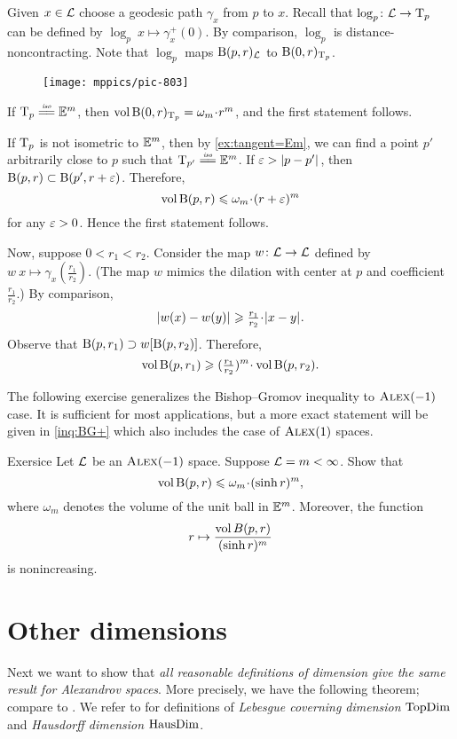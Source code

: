 Given $x\in\mathcal{L}$ choose a geodesic path $\gamma_x$ from $p$ to $x$.
Recall that $\log_p\colon\mathcal{L}\to \mathrm{T}_p$ can be defined by $\log_p\:x\mapsto \gamma_x^+(0)$.
By comparison, $\log_p$ is distance-noncontracting.
Note that $\log_p$ maps $\mathrm{B}{}(p,r)_{\mathcal{L}}$ to $\mathrm{B}{}(0,r)_{\mathrm{T}_p}$.

\begin{wrapfigure}{r}{44 mm}
\vskip-0mm
\centering
\texttt{[image: mppics/pic-803]}
\vskip1mm
\end{wrapfigure}

If $\T_p\iso \EE^m$, then $\vol\oBall(0,r)_{\T_p}\z=\omega_m\cdot r^m$,
and the first statement follows.

If $\mathrm{T}_p$ is not isometric to $\mathbb{E}^m$, then by \ref{ex:tangent=Em}, we can find a point $p'$ arbitrarily close to $p$ such that $\T_{p'}\iso \EE^m$.
If $\eps>\dist{p}{p'}{}$, then $\mathrm{B}{}(p,r)\subset \mathrm{B}{}(p',r+\varepsilon)$.
Therefore,
\[\vol \oBall(p,r)\le \omega_m\cdot (r+\eps)^m\]
for any $\varepsilon>0$.
Hence the first statement follows.

Now, suppose $0<r_1<r_2$.
Consider the map $w\colon \mathcal{L}\to \mathcal{L}$ defined by $w\:x\mapsto \gamma_x(\tfrac {r_1}{r_2})$.
(The map $w$ mimics the dilation with center at $p$ and coefficient $\tfrac {r_1}{r_2}$.)
By comparison,
\[\dist{w(x)}{w(y)}{}\ge \tfrac {r_1}{r_2}\cdot \dist{x}{y}{}.\]
Observe that $\mathrm{B}{}(p,r_1) \supset w[\mathrm{B}{}(p,r_2)]$.
Therefore, 
\[\vol \oBall(p,r_1)\ge (\tfrac {r_1}{r_2})^m\cdot\vol \oBall(p,r_2).\]
\qedsf

The following exercise generalizes the Bishop--Gromov inequality to $\textsc{Alex}(-1)$ case. 
It is sufficient for most applications, but a more exact statement will be given in \ref{inq:BG+} which also includes the case of  $\textsc{Alex}(1)$ spaces.

\begin{thm}{Exersice}\label{ex:BG}
Let $\mathcal{L}$ be an $\textsc{Alex}(-1)$ space.
Suppose $\mathcal{L}=m<\infty$.
Show that
\[\vol \oBall(p,r)\le \omega_m\cdot(\sinh r)^m,\]
where $\omega_m$ denotes the volume of the unit ball in $\mathbb{E}^m$.
Moreover, the function 
\[r\mapsto \frac{\operatorname{\rm vol}\nolimits B(p,r)}{(\sinh r)^m}\]
is nonincreasing.
\end{thm}

\section{Other dimensions}\label{sec:all-dim}

Next we want to show that \textit{all reasonable definitions of dimension give the same result for Alexandrov spaces}.
More precisely, we have the following theorem; compare to \cite[15.16]{alexander-kapovitch-petrunin2024}.
We refer to \cite{hurewicz-wallman} for definitions of \emph{Lebesgue coverning dimension} $\mathop{\rm TopDim}\nolimits$ and \emph{Hausdorff dimension} $\mathop{\rm HausDim}\nolimits$.

